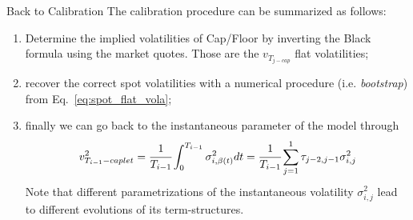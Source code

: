 \documentclass{beamer}
\begin{document}
\begin{frame}{Back to Calibration}
The calibration procedure can be summarized as follows:
\begin{enumerate}
	\item Determine the implied volatilities of Cap/Floor by inverting the Black formula using the market quotes. Those are the $v_{T_{j-cap}}$ flat volatilities;
	\item recover the correct spot volatilities with a numerical procedure (i.e. \emph{bootstrap}) from Eq.~\ref{eq:spot_flat_vola};
	\item finally we can go back to the instantaneous parameter of the model through
	\begin{equation}
		v_{T_{i-1}-caplet}^2 =\cfrac{1}{T_{i-1}} \int_0^{T_{i-1}}\sigma^2_{i,\beta(t)}dt=\cfrac{1}{T_{i-1}}\sum_{j=1}^1\tau_{j-2,j-1}\sigma^2_{i,j}
	\end{equation}
	Note that different parametrizations of the instantaneous volatility $\sigma_{i,j}^2$ lead to different evolutions of its term-structures.
\end{enumerate}
\end{frame}

\end{document}
